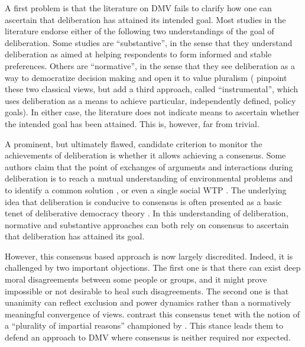 \documentclass[version=3.21, pagesize, twoside=off, bibliography=totoc, DIV=calc, fontsize=12pt, a4paper, french, english]{scrartcl}
\begin{document}
A first problem is that the literature on \ac{DMV} fails to clarify how one can ascertain that deliberation has attained its intended goal. Most studies in the literature endorse either of the following two understandings of the goal of deliberation. Some studies are “substantive”, in the sense that they understand deliberation as aimed at helping respondents to form informed and stable preferences. Others are “normative”, in the sense that they see deliberation as a way to democratize decision making and open it to value pluralism (\cite{schaafsma_guidance_2018} pinpoint these two classical views, but add a third approach, called “instrumental”, which uses deliberation as a means to achieve particular, independently defined, policy goals).  In either case, the literature does not indicate means to ascertain whether the intended goal has been attained. This is, however, far from trivial.

A prominent, but ultimately flawed, candidate criterion to monitor the achievements of deliberation is whether it allows achieving a consensus. Some authors claim that the point of exchanges of arguments and interactions during deliberation is to reach a mutual understanding of environmental problems and to identify a common solution \citep{vatn_institutional_2009}, or even a single social \ac{WTP} \citep{orchard-webb_deliberative_2016}. The underlying idea that deliberation is conducive to consensus is often presented as a basic tenet of deliberative democracy theory \citep{wilson_discourse-based_2002}. 
 In this understanding of deliberation, normative and substantive approaches can both rely on consensus to ascertain that deliberation has attained its goal.

However, this consensus based approach is now largely discredited. Indeed, it is challenged by two important objections.
The first one is that there can exist deep moral disagreements \citep{dryzek_deliberative_2013} between some people or groups, and it might prove impossible or not desirable to heal such disagreements.
The second one is that unanimity can reflect exclusion and power dynamics \citep{elster_sour_1983,volker_exploring_2016,vargas_background_2016,vargas_problem_2017,murphy_comparing_2017} rather than a normatively meaningful convergence of views.
\citeauthor{bartkowski_beyond_2018} contrast this consensus tenet with the notion of a “plurality of impartial reasons” championed by \citet{sen_idea_2009}.
This stance leads them to defend an approach to \ac{DMV} where consensus is neither required nor expected.
\end{document}
